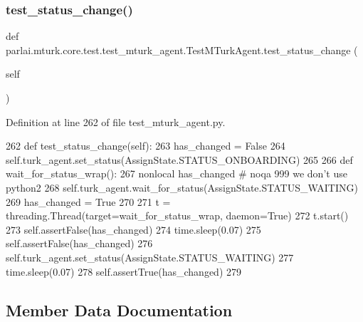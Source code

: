 \subsubsection{\texorpdfstring{test\+\_\+status\+\_\+change()}{test\_status\_change()}}
{\footnotesize\ttfamily def parlai.\+mturk.\+core.\+test.\+test\+\_\+mturk\+\_\+agent.\+Test\+M\+Turk\+Agent.\+test\+\_\+status\+\_\+change (\begin{DoxyParamCaption}\item[{}]{self }\end{DoxyParamCaption})}



Definition at line 262 of file test\+\_\+mturk\+\_\+agent.\+py.


\begin{DoxyCode}
262     \textcolor{keyword}{def }test\_status\_change(self):
263         has\_changed = \textcolor{keyword}{False}
264         self.turk\_agent.set\_status(AssignState.STATUS\_ONBOARDING)
265 
266         \textcolor{keyword}{def }wait\_for\_status\_wrap():
267             nonlocal has\_changed  \textcolor{comment}{# noqa 999 we don't use python2}
268             self.turk\_agent.wait\_for\_status(AssignState.STATUS\_WAITING)
269             has\_changed = \textcolor{keyword}{True}
270 
271         t = threading.Thread(target=wait\_for\_status\_wrap, daemon=\textcolor{keyword}{True})
272         t.start()
273         self.assertFalse(has\_changed)
274         time.sleep(0.07)
275         self.assertFalse(has\_changed)
276         self.turk\_agent.set\_status(AssignState.STATUS\_WAITING)
277         time.sleep(0.07)
278         self.assertTrue(has\_changed)
279 
\end{DoxyCode}


\subsection{Member Data Documentation}
\mbox{\label{classparlai_1_1mturk_1_1core_1_1test_1_1test__mturk__agent_1_1TestMTurkAgent_a85629bf1aeb6c3e92b0160c2d669defb}} 
